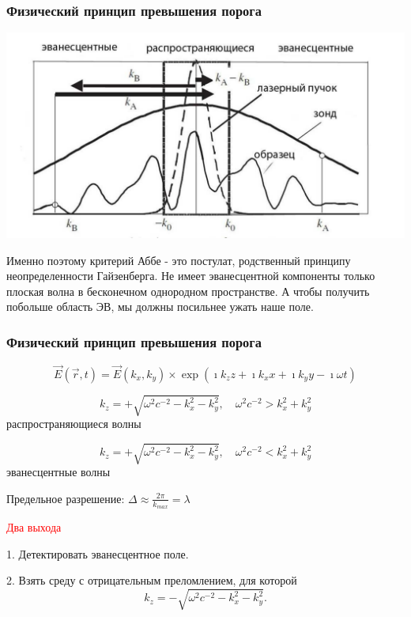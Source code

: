 \documentclass[9pt, compress, xcolor=table]{beamer}
\begin{document}
\begin{frame}[fragile]
\frametitle{Физический принцип превышения порога}
\begin{center}
\includegraphics[scale=0.35]{evanescent}
\end{center}

Именно поэтому критерий Аббе - это постулат, родственный принципу неопределенности Гайзенберга. Не имеет эванесцентной компоненты только плоская волна в бесконечном однородном пространстве. А чтобы получить побольше область ЭВ, мы должны посильнее ужать наше поле.

\end{frame}

\begin{frame}[fragile]
\frametitle{Физический принцип превышения порога}

\begin{equation*}
\vec E (\vec r, t) = \vec E(k_x, k_y) \times \exp (\imath k_z z+ \imath k_x x+\imath k_y y - \imath
\omega t)
\end{equation*}

\begin{equation*}
k_z = +\sqrt{\omega^2 c^{-2} - k_x^2 - k_y^2},\quad \omega^2 c^{-2} > k_x^2 + k_y^2
\end{equation*}
распространяющиеся волны

\begin{equation*}
k_z = +\sqrt{\omega^2 c^{-2} - k_x^2 - k_y^2},\quad \omega^2 c^{-2} < k_x^2 + k_y^2
\end{equation*}
эванесцентные волны

Предельное разрешение: $\Delta \approx \frac{2 \pi}{k_{max}} = \lambda$

\textcolor{red}{Два выхода}

1. Детектировать эванесцентное поле.

2. Взять среду с отрицательным преломлением, для которой
\begin{equation*}
k_z = -\sqrt{\omega^2 c^{-2} - k_x^2 - k_y^2}.
\end{equation*}

\end{frame}
\end{document}
